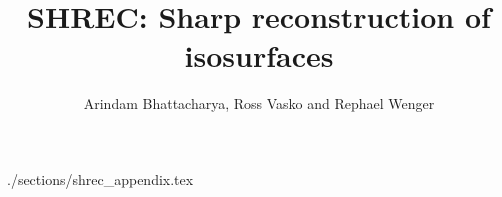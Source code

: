 \documentclass[review,journal]{vgtc}          %
\title{SHREC: Sharp reconstruction of isosurfaces}
\author{Arindam Bhattacharya, Ross Vasko and Rephael Wenger}
\begin{document}










 {./sections/shrec_appendix.tex}
\end{document}
